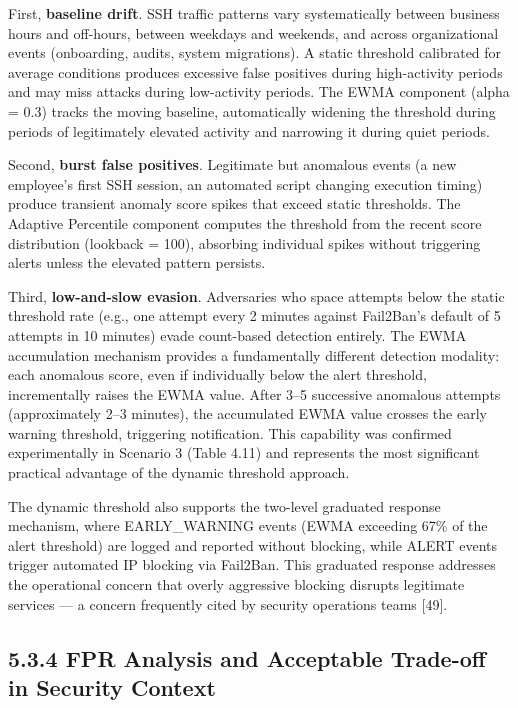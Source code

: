 \documentclass[
  a4paper]{report}
\begin{document}
First, \textbf{baseline drift}. SSH traffic patterns vary systematically
between business hours and off-hours, between weekdays and weekends, and
across organizational events (onboarding, audits, system migrations). A
static threshold calibrated for average conditions produces excessive
false positives during high-activity periods and may miss attacks during
low-activity periods. The EWMA component (alpha = 0.3) tracks the moving
baseline, automatically widening the threshold during periods of
legitimately elevated activity and narrowing it during quiet periods.

Second, \textbf{burst false positives}. Legitimate but anomalous events
(a new employee's first SSH session, an automated script changing
execution timing) produce transient anomaly score spikes that exceed
static thresholds. The Adaptive Percentile component computes the
threshold from the recent score distribution (lookback = 100), absorbing
individual spikes without triggering alerts unless the elevated pattern
persists.

Third, \textbf{low-and-slow evasion}. Adversaries who space attempts
below the static threshold rate (e.g., one attempt every 2 minutes
against Fail2Ban's default of 5 attempts in 10 minutes) evade
count-based detection entirely. The EWMA accumulation mechanism provides
a fundamentally different detection modality: each anomalous score, even
if individually below the alert threshold, incrementally raises the EWMA
value. After 3--5 successive anomalous attempts (approximately 2--3
minutes), the accumulated EWMA value crosses the early warning
threshold, triggering notification. This capability was confirmed
experimentally in Scenario 3 (Table 4.11) and represents the most
significant practical advantage of the dynamic threshold approach.

The dynamic threshold also supports the two-level graduated response
mechanism, where EARLY\_WARNING events (EWMA exceeding 67\% of the alert
threshold) are logged and reported without blocking, while ALERT events
trigger automated IP blocking via Fail2Ban. This graduated response
addresses the operational concern that overly aggressive blocking
disrupts legitimate services --- a concern frequently cited by security
operations teams {[}49{]}.

\subsection{5.3.4 FPR Analysis and Acceptable Trade-off in Security
Context}\label{fpr-analysis-and-acceptable-trade-off-in-security-context}
\end{document}
